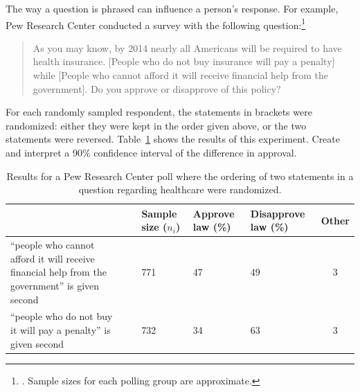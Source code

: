 \begin{example}{The way a question is phrased can influence a person's response. For example, Pew Research Center conducted a survey with the following question:\footnote{. Sample sizes for each polling group are approximate.}
\begin{quote}
As you may know, by 2014 nearly all Americans will be required to have health insurance. [People who do not buy insurance will pay a penalty] while [People who cannot afford it will receive financial help from the government]. Do you approve or disapprove of this policy?
\end{quote}
For each randomly sampled respondent, the statements in brackets were randomized: either they were kept in the order given above, or the two statements were reversed. Table~\ref{pewPollResultsForRandomizedStatementOrdering} shows the results of this experiment. Create and interpret a 90\% confidence interval of the difference in approval.}

\begin{table}[t]
\centering
\begin{tabular}{p{50mm}c p{13mm}p{14mm}p{16.5mm}c}
	&\ & Sample size ($n_i$) & Approve law (\%)	& Disapprove law (\%)	& Other \\
\hline
``people who cannot afford it will receive financial help from the government'' is given second \vspace{2.5mm}
	& & 771	& 47	& 49	& 3 \\
``people who do not buy it will pay a penalty'' is given second
	& & 732	& 34	& 63	& 3 \\
\hline
\end{tabular}
\caption{Results for a Pew Research Center poll where the ordering of two statements in a question regarding healthcare were randomized.}
\label{pewPollResultsForRandomizedStatementOrdering}
\end{table}


\end{example}

